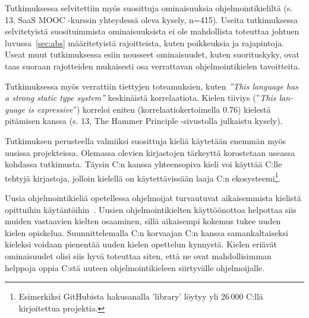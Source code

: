 Tutkimuksessa selvitettiin myös suosittuja ominaisuuksia ohjelmointikieliltä
(s. 13, SaaS MOOC -kurssin yhteydessä oleva kysely, n=415). Useita
tutkimuksessa selvitetyistä suosituimmista ominaisuuksista ei ole mahdollista
toteuttaa johtuen luvussa~\ref{sec:abs} määritetyistä rajoitteista, kuten
poikkeuksia ja rajapintoja. Useat muut tutkimuksessa esiin nousseet
ominaisuudet, kuten suorituskyky, ovat taas suoraan rajotteiden mukaisesti osa
verrattavan ohjelmointikielen tavoitteita.

Tutkimuksessa myös verrattiin tiettyjen toteamuksien, kuten
\emph{''\foreignlanguage{english}{This language has a strong static type
system}''} keskinäistä korrelaatiota. Kielen tiiviys
(''\emph{\foreignlanguage{english}{This language is expressive}}'') korreloi
eniten (korrelaatiokertoimella 0.76) kielestä pitämisen kanssa (s. 13, The
Hammer Principle -sivustolla julkaistu kysely).


Tutkimuksen perusteella valmiiksi suosittuja kieliä käytetään enemmän myös
uusissa projekteissa. Olemassa olevien kirjastojen tärkeyttä korostetaan
useassa kohdassa tutkimusta. Täysin C:n kanssa yhteensopiva kieli voi käyttää
C:lle tehtyjä kirjastoja, jolloin kielellä on käytettävissään laaja C:n
ekosysteemi\footnote{Esimerkiksi GitHubista hakusanalla 'library' löytyy yli
26\,000 C:llä kirjoitettua projektia.}.

Uusia ohjelmointikieliä opetellessa ohjelmoijat turvautuvat aikaisemmista
kielistä opittuihin käytäntöihin~\citep{languagelearning}. Uusien
ohjelmointikielten käyttöönottoa helpottaa siis muiden vastaavien kielten
osaaminen, sillä aikaisempi kokemus tukee uuden kielen opiskelua.
Suunnittelemalla C:n korvaajan C:n kanssa samankaltaiseksi kieleksi voidaan
pienentää uuden kielen opettelun kynnystä. Kielen eriävät ominaisuudet olisi
siis hyvä toteuttaa siten, että ne ovat mahdollisimman helppoja oppia C:stä
uuteen ohjelmointikieleen siirtyvälle ohjelmoijalle.


